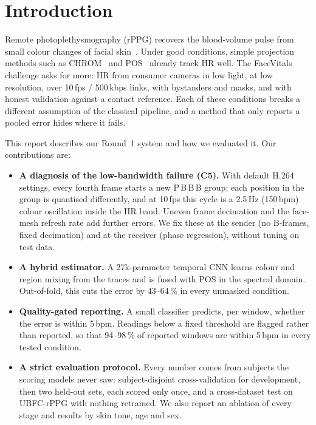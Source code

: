 \documentclass[conference]{IEEEtran}
\newcommand{\bpm}{\,bpm}
\begin{document}
\section{Introduction}
Remote photoplethysmography (rPPG) recovers the blood-volume pulse from small colour changes of facial
skin~\cite{verkruysse2008,poh2010}. Under good conditions, simple projection methods such as
CHROM~\cite{dehaan2013} and POS~\cite{wang2017} already track HR well. The FaceVitals challenge asks for
more: HR from consumer cameras in low light, at low resolution, over 10\,fps / 500\,kbps links, with
bystanders and masks, and with honest validation against a contact reference. Each of these conditions
breaks a different assumption of the classical pipeline, and a method that only reports a pooled error
hides where it fails.

This report describes our Round~1 system and how we evaluated it. Our contributions are:
\begin{itemize}
\item \textbf{A diagnosis of the low-bandwidth failure (C5).} With default H.264 settings, every
fourth frame starts a new P\,B\,B\,B group; each position in the group is quantised differently, and at 10\,fps this
cycle is a 2.5\,Hz (150\bpm) colour oscillation inside the HR band. Uneven frame decimation and the
face-mesh refresh rate add further errors. We fix these at the sender (no B-frames, fixed decimation)
and at the receiver (phase regression), without tuning on test data.
\item \textbf{A hybrid estimator.} A 27k-parameter temporal CNN learns colour and region mixing from
the traces and is fused with POS in the spectral domain. Out-of-fold, this cuts the error by 43--64\,\% in every
unmasked condition.
\item \textbf{Quality-gated reporting.} A small classifier predicts, per window, whether the
error is within 5\bpm. Readings below a fixed threshold are flagged rather than reported, so that 94--98\,\%
of reported windows are within 5\bpm{} in every tested condition.
\item \textbf{A strict evaluation protocol.} Every number comes from subjects the scoring models
never saw: subject-disjoint cross-validation for development, then two held-out sets, each scored
only once, and a cross-dataset test on UBFC-rPPG with nothing retrained. We also report an ablation of
every stage and results by skin tone, age and sex.
\end{itemize}
\end{document}
